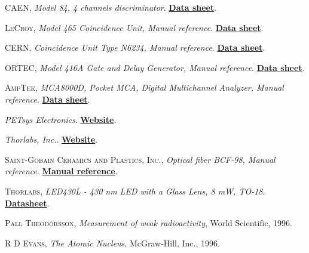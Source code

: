 \begin{thebibliography}{100}
 \textsc{CAEN},
\textit{Model 84, 4 channels discriminator}. \href{https://www.google.com/url?sa=t&rct=j&q=&esrc=s&source=web&cd=&ved=2ahUKEwiLyonzjL_wAhULAWMBHYTOBVoQFjACegQIBRAD&url=https\%3A\%2F\%2Fwwwusers.ts.infn.it\%2F~rui\%2Funiv\%2FAcquisizione_Dati\%2FManuals\%2FCAEN\%2520N84.pdf&usg=AOvVaw379eLskdwjPuXY6fUmnIPk}{\textbf{Data sheet}}.

 \textsc{LeCroy},
\textit{Model 465 Coincidence Unit, Manual reference}. \href{https://prep.fnal.gov/catalog/hardware_info/lecroy/nim/465.html}{\textbf{Data sheet}}.

 \textsc{CERN},
\textit{Coincidence Unit Type N6234, Manual reference}. \href{}{\textbf{Data sheet}}.

 \textsc{ORTEC},
\textit{Model 416A Gate and Delay Generator, Manual reference}. \href{https://www.ortec-online.com/products/electronics/delays-gates-and-logic-modules/416a}{\textbf{Data sheet}}.

 \textsc{AmpTek},
\textit{MCA8000D, Pocket MCA, Digital Multichannel Analyzer, Manual reference}. \href{https://www.amptek.com/products/multichannel-analyzers/mca-8000d-digital-multichannel-analyzer}{\textbf{Data sheet}}.

 \textit{PETsys Electronics}. \href{https://www.petsyselectronics.com/web/private/login}{\textbf{Website}}.

 \textit{Thorlabs, Inc.}. \href{https://www.thorlabs.com/}{\textbf{Website}}.

 \textsc{Saint-Gobain Ceramics and Plastics, Inc.},
\textit{Optical fiber BCF-98, Manual reference}. \href{https://www.crystals.saint-gobain.com/products/scintillating-fiber}{\textbf{Manual reference}}.

 \textsc{Thorlabs},
\textit{LED430L - 430 nm LED with a Glass Lens, 8 mW, TO-18}. \href{https://www.thorlabs.com/thorproduct.cfm?partnumber=LED430L}{\textbf{Datasheet}}.

 \textsc{Pall Theodórsson},
\textit{Measurement of weak radioactivity}, World Scientific, 1996.

 \textsc{R D Evans},
\textit{The Atomic Nucleus}, McGraw-Hill, Inc., 1996.


\end{thebibliography}
